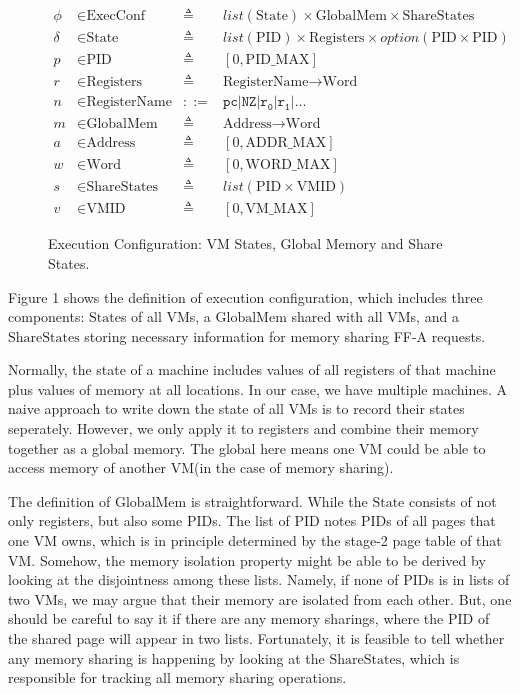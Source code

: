 \documentclass[a4paper]{article}
\newcommand*{\defined}{\triangleq}
\newcommand*{\maps}{\rightarrow}
\newcommand*{\derived}{::=}
\newcommand*{\CONF}{\text{ExecConf}}
\newcommand*{\STATE}{\text{State}}
\newcommand*{\MEM}{\text{GlobalMem}}
\newcommand*{\SSS}{\text{ShareStates}}
\newcommand*{\PID}{\text{PID}}
\newcommand*{\REGS}{\text{Registers}}
\newcommand*{\ADDR}{\text{Address}}
\newcommand*{\WORD}{\text{Word}}
\newcommand*{\VMID}{\text{VMID}}
\newcommand*{\REGNAMES}{\text{RegisterName}}
\newcommand*{\PAMAX}{\text{ADDR\_MAX}}
\newcommand*{\PPIDMAX}{\text{PID\_MAX}}
\newcommand*{\PWMAX}{\text{WORD\_MAX}}
\newcommand*{\PVMMAX}{\text{VM\_MAX}}
\begin{document}
\begin{figure}
  \begin{align*}
    \phi &\in \CONF &\defined &list(\STATE) \times \MEM \times \SSS \\
    \delta &\in \STATE &\defined &list(\PID) \times \REGS \times option(\PID \times \PID) \\
    p & \in \PID &\defined  &[ 0, \PPIDMAX ] \\
    r & \in \REGS &\defined  &\REGNAMES \maps \WORD \\
    n & \in \REGNAMES &\derived  &\mathtt{pc} | \mathtt{NZ} | \mathtt {r_{0}} | \mathtt{r_{1}} | \dots \\
    m & \in \MEM &\defined  &\ADDR \maps \WORD \\
    a & \in \ADDR &\defined  &[ 0, \PAMAX ] \\
    w & \in \WORD &\defined  &[ 0, \PWMAX ] \\
    s & \in \SSS &\defined  &list(\PID \times \VMID) \\
    v & \in \VMID &\defined  &[ 0, \PVMMAX ]
  \end{align*}
  \caption{Execution Configuration: VM States, Global Memory and Share States.}
\end{figure}
Figure 1 shows the definition of execution configuration, which includes three
components: $\STATE$s of all VMs, a $\MEM$ shared with all VMs, and a $\SSS$
storing necessary information for memory sharing FF-A requests.

Normally, the state of a machine includes values of all
registers of that machine plus values of memory at all locations. In our case,
we have multiple machines. A naive approach to write down the state of all VMs
is to record their states seperately. However, we only apply it to registers and
combine their memory together as a global memory. The global here means one VM
could be able to access memory of another VM(in the case of memory sharing).

The definition of $\MEM$ is straightforward. While the $\STATE$ consists of not
only registers, but also some $\PID$s.
The list of $\PID$ notes $\PID$s of all
pages that one VM owns, which is in principle determined by the stage-2 page
table of that VM.
Somehow, the memory isolation property might be able to be derived
by looking at the disjointness among these lists. Namely, if none of $\PID$s is in
lists of two VMs, we may argue that their memory are isolated from each other.
But, one should be careful to say it if there are any memory sharings, where the $\PID$
of the shared page will appear in two lists. Fortunately, it is feasible to tell
whether any memory sharing is happening by looking at the $\SSS$, which is responsible
for tracking all memory sharing operations.
\end{document}
